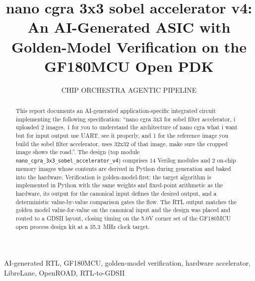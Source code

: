 \documentclass{ieeeaccess}
\begin{document}

\title{nano cgra 3x3 sobel accelerator v4: An AI-Generated ASIC with Golden-Model Verification on the GF180MCU Open PDK}
\author{\uppercase{Chip Orchestra Agentic Pipeline}}
\address[1]{Chip Orchestra --- AI-native digital IC orchestration platform (task \texttt{dbe7af46-366c-421b-8cf3-daafc5a7ae6a})}



\begin{abstract}
This report documents an AI-generated application-specific integrated circuit implementing the following specification: ``nano cgra 3x3 for sobel filter accelerator, i uploaded 2 images, 1 for you to understand the architecture of nano cgra what i want but for input output use UART, see it properly, and 1 for the reference image you build the sobel filter accelerator, uses 32x32 of that image, make sure the cropped image shows the road.''. The design (top module \texttt{nano\_cgra\_3x3\_sobel\_accelerator\_v4}) comprises 14 Verilog modules and 2 on-chip memory images whose contents are derived in Python during generation and baked into the hardware. Verification is golden-model-first: the target algorithm is implemented in Python with the same weights and fixed-point arithmetic as the hardware, its output for the canonical input defines the desired output, and a deterministic value-by-value comparison gates the flow. The RTL output matches the golden model value-for-value on the canonical input and the design was placed and routed to a GDSII layout, closing timing on the 5.0V corner set of the GF180MCU open process design kit at a 35.3~MHz clock target.
\end{abstract}

\begin{keywords}
AI-generated RTL, GF180MCU, golden-model verification, hardware accelerator, LibreLane, OpenROAD, RTL-to-GDSII
\end{keywords}
\end{document}
